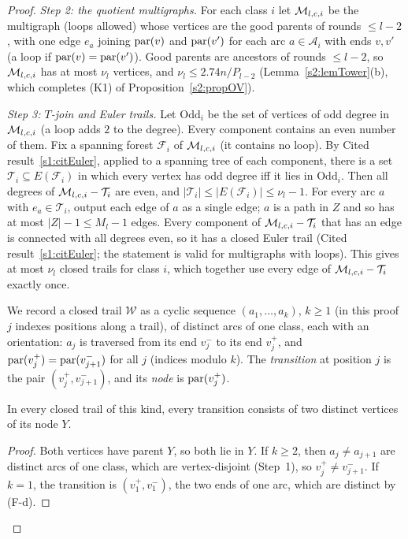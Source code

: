 \begin{proof}
\emph{Step 2: the quotient multigraphs.} For each class $i$ let $\mathcal{M}_{l,c,i}$ be the multigraph (loops allowed) whose vertices are the good parents of rounds $\le l-2$, with one edge $e_a$ joining $\mathrm{par}(v)$ and $\mathrm{par}(v')$ for each arc $a\in\mathcal A_i$ with ends $v,v'$ (a loop if $\mathrm{par}(v)=\mathrm{par}(v')$). Good parents are ancestors of rounds $\le l-2$, so $\mathcal{M}_{l,c,i}$ has at most $\nu_l$ vertices, and $\nu_l\le2.74n/P_{l-2}$ (Lemma~\ref{s2:lemTower}(b), which completes (K1) of Proposition~\ref{s2:propOV}).

\emph{Step 3: $T$-join and Euler trails.} Let $\mathrm{Odd}_i$ be the set of vertices of odd degree in $\mathcal{M}_{l,c,i}$ (a loop adds $2$ to the degree). Every component contains an even number of them. Fix a spanning forest $\mathcal F_i$ of $\mathcal{M}_{l,c,i}$ (it contains no loop). By Cited result~\ref{s1:citEuler}, applied to a spanning tree of each component, there is a set $\mathcal T_i\subseteq E(\mathcal F_i)$ in which every vertex has odd degree iff it lies in $\mathrm{Odd}_i$. Then all degrees of $\mathcal{M}_{l,c,i}-\mathcal T_i$ are even, and $|\mathcal T_i|\le|E(\mathcal F_i)|\le\nu_l-1$. For every arc $a$ with $e_a\in\mathcal T_i$, output each edge of $a$ as a single edge; $a$ is a path in $Z$ and so has at most $|Z|-1\le M_l-1$ edges. Every component of $\mathcal{M}_{l,c,i}-\mathcal T_i$ that has an edge is connected with all degrees even, so it has a closed Euler trail (Cited result~\ref{s1:citEuler}; the statement is valid for multigraphs with loops). This gives at most $\nu_l$ closed trails for class $i$, which together use every edge of $\mathcal{M}_{l,c,i}-\mathcal T_i$ exactly once.

We record a closed trail $\mathcal W$ as a cyclic sequence $(a_1,\dots,a_k)$, $k\ge1$ (in this proof $j$ indexes positions along a trail), of distinct arcs of one class, each with an orientation: $a_j$ is traversed from its end $v_j^-$ to its end $v_j^+$, and $\mathrm{par}(v_j^+)=\mathrm{par}(v_{j+1}^-)$ for all $j$ (indices modulo $k$). The \emph{transition} at position $j$ is the pair $(v_j^+,v_{j+1}^-)$, and its \emph{node} is $\mathrm{par}(v_j^+)$.

\begin{claim}[transitions]
In every closed trail of this kind, every transition consists of two distinct vertices of its node $Y$.
\end{claim}
\begin{proof}
Both vertices have parent $Y$, so both lie in $Y$. If $k\ge2$, then $a_j\ne a_{j+1}$ are distinct arcs of one class, which are vertex-disjoint (Step~1), so $v_j^+\ne v_{j+1}^-$. If $k=1$, the transition is $(v_1^+,v_1^-)$, the two ends of one arc, which are distinct by (F-d).
\end{proof}


\end{proof}
